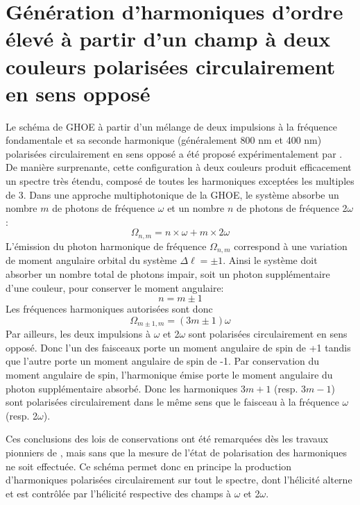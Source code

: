 \section[GHOE à partir d'un champ à deux couleurs polarisées circulairement en sens opposé]{Génération d'harmoniques d'ordre élevé à partir d'un champ à deux couleurs polarisées circulairement en sens opposé}
\label{sec:Intro2couleurs}
Le schéma de GHOE à partir d'un mélange de deux impulsions à la fréquence fondamentale et sa seconde harmonique (généralement 800 nm et 400 nm) polarisées circulairement en sens opposé a été proposé expérimentalement par . De manière surprenante, cette configuration à deux couleurs produit efficacement un spectre très étendu, composé de toutes les harmoniques exceptées les multiples de 3. Dans une approche multiphotonique de la GHOE, le système absorbe un nombre $m$ de photons de fréquence $\omega$ et un nombre $n$ de photons de fréquence 2$\omega$: 
\begin{equation}
\Omega_{n,m} = n \times \omega + m \times 2 \omega
\end{equation}
L'émission du photon harmonique de fréquence $\Omega_{n,m}$ correspond à une variation de moment angulaire orbital du système $\Delta \ell = \pm 1$. Ainsi le système doit absorber un nombre total de photons impair, soit un photon supplémentaire d'une couleur, pour conserver le moment angulaire:
\begin{equation}
n = m \pm 1
\end{equation}
Les fréquences harmoniques autorisées sont donc
\begin{equation}
\Omega_{m \pm 1,m} = (3m \pm 1) \omega
\end{equation}
Par ailleurs, les deux impulsions à $\omega$ et 2$\omega$ sont polarisées circulairement en sens opposé. Donc l'un des faisceaux porte un moment angulaire de spin de +1 tandis que l'autre porte un moment angulaire de spin de -1. Par conservation du moment angulaire de spin, l'harmonique émise porte le moment angulaire du photon supplémentaire absorbé. Donc les harmoniques $3m+1$ (resp. $3m-1$) sont polarisées circulairement dans le même sens que le faisceau à la fréquence $\omega$ (resp. 2$\omega$).

Ces conclusions des lois de conservations ont été remarquées dès les travaux pionniers de , mais sans que la mesure de l'état de polarisation des harmoniques ne soit effectuée. Ce schéma permet donc en principe la production d'harmoniques polarisées circulairement sur tout le spectre, dont l'hélicité alterne et est contrôlée par l'hélicité respective des champs à $\omega$ et 2$\omega$.


